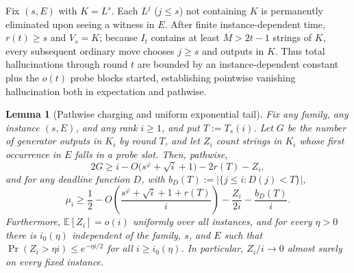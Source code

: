 \documentclass[11pt]{article}
\theoremstyle{plain}
\newtheorem{lemma}[theorem]{Lemma}
\theoremstyle{definition}
\theoremstyle{remark}
\begin{document}
Fix $(s, E)$ with $K = L^s$.
Each $L^j$ ($j \le s$) not containing $K$ is permanently eliminated upon seeing a witness in $E$.
After finite instance-dependent time, $r(t) \ge s$ and $V_s = K$; because $I_t$ contains at least $M > 2t - 1$ strings of $K$, every subsequent ordinary move chooses $j \ge s$ and outputs in $K$.
Thus total hallucinations through round $t$ are bounded by an instance-dependent constant plus the $o(t)$ probe blocks started, establishing pointwise vanishing hallucination both in expectation and pathwise.

\begin{lemma}[Pathwise charging and uniform exponential tail]\label{lem:charging}
Fix any family, any instance $(s, E)$, and any rank $i \ge 1$, and put $T := T_s(i)$.
Let $G$ be the number of generator outputs in $K_i$ by round $T$, and let $Z_i$ count strings in $K_i$ whose first occurrence in $E$ falls in a probe slot.
Then, pathwise,
\[
2G \ge i - O\bigl(s^\varphi + \sqrt{i} + 1\bigr) - 2r(T) - Z_i,
\]
and for any deadline function $D$, with $b_D(T) := |\{j \le i : D(j) < T\}|$,
\[
\mu_i \ge \frac{1}{2} - O\!\left(\frac{s^\varphi + \sqrt{i} + 1 + r(T)}{i}\right) - \frac{Z_i}{2i} - \frac{b_D(T)}{i}.
\]
Furthermore, $\mathbb{E}[Z_i] = o(i)$ uniformly over all instances, and for every $\eta > 0$ there is $i_0(\eta)$ independent of the family, $s$, and $E$ such that $\Pr(Z_i > \eta i) \le e^{-\eta i/2}$ for all $i \ge i_0(\eta)$.
In particular, $Z_i/i \to 0$ almost surely on every fixed instance.
\end{lemma}
\end{document}

